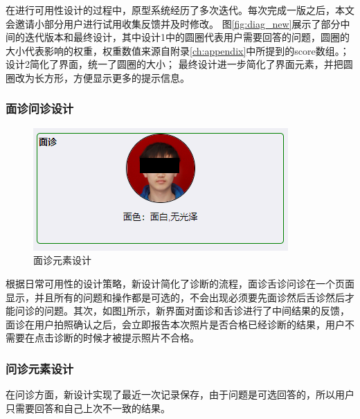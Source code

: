 在进行可用性设计的过程中，原型系统经历了多次迭代。每次完成一版之后，本文会邀请小部分用户进行试用收集反馈并及时修改。
图\ref{fig:diag_new}展示了部分中间的迭代版本和最终设计，其中设计1中的圆圈代表用户需要回答的问题，圆圈的大小代表影响的权重，权重数值来源自附录\ref{ch:appendix}中所提到的score数组。；
设计2简化了界面，统一了圆圈的大小；
最终设计进一步简化了界面元素，并把圆圈改为长方形，方便显示更多的提示信息。

\subsubsection{面诊问诊设计}

\begin{figure}[h]
    \centering
    \includegraphics[]{images/diag_design.png}
    \caption{面诊元素设计}
    \label{fig:diag_design}
\end{figure}

根据日常可用性的设计策略，新设计简化了诊断的流程，面诊舌诊问诊在一个页面显示，并且所有的问题和操作都是可选的，不会出现必须要先面诊然后舌诊然后才能问诊的问题。其次，如图\ref{fig:diag_design}所示，新界面对面诊和舌诊进行了中间结果的反馈，面诊在用户拍照确认之后，会立即报告本次照片是否合格已经诊断的结果，用户不需要在点击诊断的时候才被提示照片不合格。

\subsubsection{问诊元素设计}
在问诊方面，新设计实现了最近一次记录保存，由于问题是可选回答的，所以用户只需要回答和自己上次不一致的结果。

